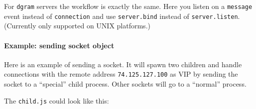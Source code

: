 For \texttt{dgram} servers the workflow is exactly the same. Here you
listen on a \texttt{message} event instead of \texttt{connection} and
use \texttt{server.bind} instead of \texttt{server.listen}. (Currently
only supported on UNIX platforms.)

\paragraph{Example: sending socket object}

Here is an example of sending a socket. It will spawn two children and
handle connections with the remote address \texttt{74.125.127.100} as
VIP by sending the socket to a ``special'' child process. Other sockets
will go to a ``normal'' process.

\begin{Shaded}
\begin{Highlighting}[]
 \NormalTok{(}\NormalTok{, [}\NormalTok{]);}
 \NormalTok{(}\NormalTok{, [}\NormalTok{]);}

 \NormalTok{();}
\NormalTok{(}\NormalTok{, } 

   \NormalTok{(} \NormalTok{=== }\NormalTok{) \{}
    \NormalTok{(}
    \NormalTok{;}
  \NormalTok{\}}
  \NormalTok{(}
\NormalTok{\});}
\NormalTok{(}\NormalTok{);}
\end{Highlighting}
\end{Shaded}

The \texttt{child.js} could look like this:

\begin{Shaded}
\begin{Highlighting}[]
\NormalTok{(}\NormalTok{, }
   \NormalTok{) \{}
    \NormalTok{(} \NormalTok{+ }\NormalTok{[}\NormalTok{] + }\NormalTok{);}
  \NormalTok{\}}
\NormalTok{\});}
\end{Highlighting}
\end{Shaded}

